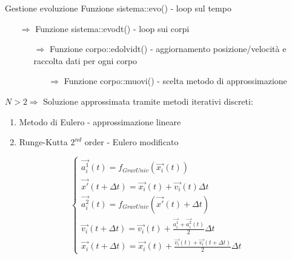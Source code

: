         \begin{frame}{Gestione evoluzione}
            Funzione sistema::evo() - loop sul tempo
            \begin{itemize}
                \item[$\Rightarrow$] Funzione sistema::evodt() - loop sui corpi
                \begin{itemize}
                    \item[$\Rightarrow$] Funzione corpo::edolvidt() - aggiornamento posizione/velocità e raccolta dati per ogni corpo
                    \begin{itemize}
                        \item[$\Rightarrow$] Funzione corpo::muovi() - scelta metodo di approssimazione
                    \end{itemize}
                \end{itemize}
            \end{itemize}    

            \begin{exampleblock}{$N>2 \Rightarrow$ Soluzione approssimata tramite metodi iterativi discreti:}
                \begin{enumerate}
                    \item Metodo di Eulero - approssimazione lineare
                    \item Runge-Kutta $2^{nd}$ order - Eulero modificato
                \end{enumerate}
                \begin{equation}
                \left\{ 
                \begin{array}{l}
                    \vec{a_i^1}(t)=f_{GravUniv}(\vec{x_i}(t)) \\
                    \vec{x'}(t+\Delta t)=\vec{x_i}(t)+\vec{v_i}(t)\Delta t \\
                    \vec{a_i^2}(t)=f_{GravUniv}(\vec{x'}(t)+\Delta t) \\
                    \vec{v_i}(t+\Delta t)=\vec{v_i}(t)+\frac{\vec{a_i^1}+\vec{a_i^2}(t)}{2}\Delta t \\
                    \vec{x_i}(t+\Delta t)=\vec{x_i}(t)+\frac{\vec{v_i}(t)+\vec{v_i}(t+\Delta t)}{2}\Delta t
                \end{array}
                \right.
                \end{equation}
            \end{exampleblock}
        \end{frame}

